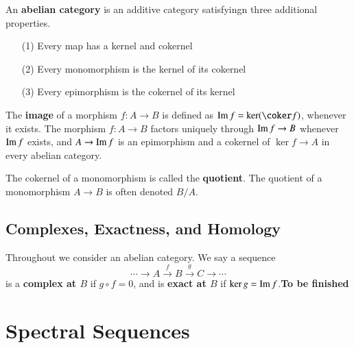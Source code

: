 An \textbf{abelian category} is an additive category satisfyingn three additional properties. \begin{itemize}
    \item[(1)] Every map has a kernel and cokernel
    \item[(2)] Every monomorphism is the kernel of its cokernel 
    \item[(3)] Every epimorphism is the cokernel of its kernel
\end{itemize}
The \textbf{image} of a morphism $f:A\rightarrow B$ is defined as $\ran f = \ker(\coker f)$, whenever it exists. The morphism $f:A\rightarrow B$ factors uniquely through $\operatorname{Im} f\rightarrow B$ whenever $\operatorname{Im} f$ exists, and $A \rightarrow \operatorname{Im} f$ is an epimorphism and a cokernel of $\ker f\rightarrow A$ in every abelian category.

The cokernel of a monomorphism is called the \textbf{quotient}. The quotient of a monomorphism $A\rightarrow B$ is often denoted $B/A$.

\subsection{Complexes, Exactness, and Homology}

Throughout we consider an abelian category. We say a sequence \begin{equation*}
    \cdots\rightarrow A\xrightarrow{f}B\xrightarrow{g}C\rightarrow\cdots
\end{equation*}
is a \textbf{complex at $B$} if $g\circ f = 0$, and is \textbf{exact at $B$} if $\ker g = \operatorname{Im} f$.\textbf{To be finished}


\section{Spectral Sequences}
